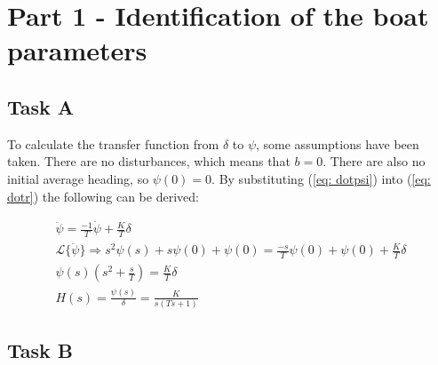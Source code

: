 \section{Part 1 - Identification of the boat parameters}

\subsection{Task A}

To calculate the transfer function from $\delta$ to $\psi$, some assumptions have been taken. There are no disturbances, which means that $b = 0$. There are also no initial average heading, so $\psi(0) = 0$. \newline
By substituting (\ref{eq: dotpsi}) into (\ref{eq: dotr}) the following can be derived:

\begin{align}
    \ddot{\psi} = \frac{-1}{T}\dot{\psi}+\frac{K}{T}\delta \nonumber \\
    \mathcal{L}\{\ddot{\psi}\} \Rightarrow s^2\psi(s)+s\psi(0)+\psi(0) = \frac{-s}{T}\psi(0)+\psi(0)+\frac{K}{T}\delta \nonumber \\
    \psi(s)(s^2+\frac{s}{T}) = \frac{K}{T}\delta \nonumber \\
    H(s) = \frac{\psi(s)}{\delta} = \frac{K}{s(Ts+1)}
\end{align}

\subsection{Task B}